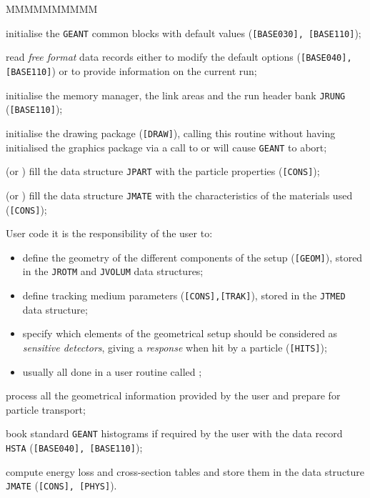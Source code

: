 \begin{DLtt}{MMMMMMMMMM}
\item[\Rind{GINIT}]
initialise the {\tt GEANT} common blocks
with default values ({\tt [BASE030], [BASE110]});
\item[\Rind{GFFGO}]
read {\it free format} data records either to
modify the default options ({\tt [BASE040],
[BASE110]}) or to provide information on the current run;
\item[\Rind{GZINIT}]
initialise the memory manager, the link areas
and the run header bank {\tt JRUNG} ({\tt [BASE110]});
\item[\Rind{GDINIT}]
initialise the drawing package ({\tt [DRAW]}), calling this routine
without having initialised the graphics package via a call to 
or  will cause {\tt GEANT} to abort;
\item[\Rind{GPART}]
(or ) fill the data structure {\tt JPART}
with the particle properties ({\tt [CONS]});
\item[\Rind{GMATE}] (or )
fill the data structure {\tt JMATE}
with the characteristics of the materials used
({\tt [CONS]});
\item[User code] it is the responsibility of the user to:
\begin{itemize}
\item define the geometry of the different components of
the setup ({\tt [GEOM]}), stored in the {\tt JROTM} and {\tt JVOLUM} data
structures; 
\item define tracking medium parameters ({\tt [CONS],[TRAK]}), stored
in the {\tt JTMED} data structure;
\item specify which elements of the geometrical
setup should be considered as {\it sensitive detectors}, giving
a {\it response} when hit by a particle ({\tt [HITS]});
\item usually all done in a user routine called ;
\end{itemize}
\item[\Rind{GGCLOS}]
process all the geometrical information
provided by the user and prepare for particle transport;
\item[\Rind{GBHSTA}]
book standard {\tt GEANT} histograms if required by
the user with the data record {\tt HSTA} ({\tt [BASE040], [BASE110]});
\item[\Rind{GPHYSI}]
compute energy loss and cross-section tables
and store them in the data structure {\tt JMATE} ({\tt [CONS], [PHYS]}).
\end{DLtt}
 
